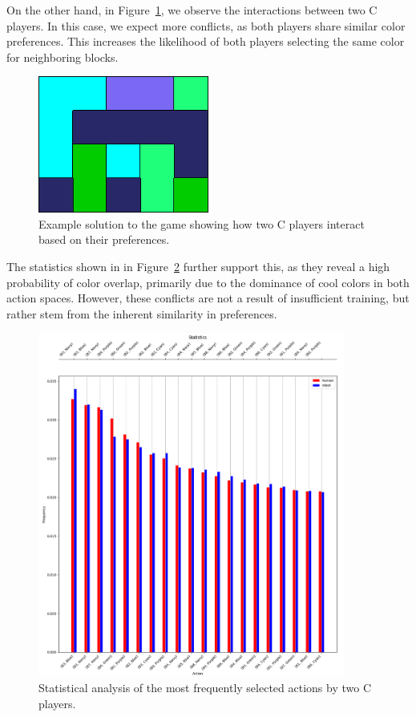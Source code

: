         \noindent
        On the other hand, in Figure~\ref{fig:cc-solution}, we observe the interactions between two C players. In this case, we expect more conflicts, as both players share similar color preferences. This increases the likelihood of both players selecting the same color for neighboring blocks.
        \begin{figure}[H]
            \centering
            \includegraphics[width=0.5\textwidth]{images/cc-solution.png}
            \caption{Example solution to the game showing how two C players interact based on their preferences.}
            \label{fig:cc-solution}
        \end{figure}
        
        \noindent
        The statistics shown in in Figure~\ref{fig:cc-stats} further support this, as they reveal a high probability of color overlap, primarily due to the dominance of cool colors in both action spaces. However, these conflicts are not a result of insufficient training, but rather stem from the inherent similarity in preferences.
        \begin{figure}[H]
            \centering
            \includegraphics[width=0.9\textwidth]{images/cc-stats.png}
            \caption{Statistical analysis of the most frequently selected actions by two C players.}
            \label{fig:cc-stats}
        \end{figure}


